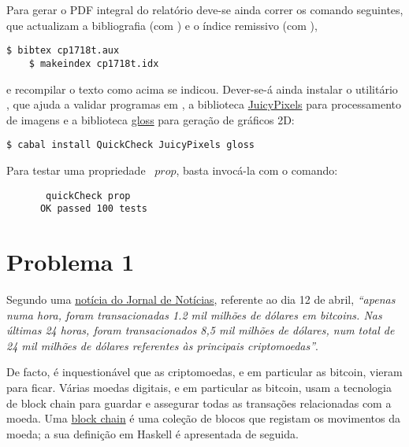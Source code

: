 \documentclass[a4paper]{article}
\newcommand{\Conid}[1]{\mathit{#1}}
\newcommand{\Varid}[1]{\mathit{#1}}
\def\resethooks{%
  \global\let\SaveRestoreHook\empty
  \global\let\ColumnHook\empty}
\let\hspre\empty
\let\hspost\empty
\begin{document}
Para gerar o PDF integral do relatório deve-se ainda correr os comando seguintes,
que actualizam a bibliografia (com \Bibtex) e o índice remissivo (com \Makeindex),
\begin{Verbatim}[fontsize=\small]
    $ bibtex cp1718t.aux
    $ makeindex cp1718t.idx
\end{Verbatim}
e recompilar o texto como acima se indicou. Dever-se-á ainda instalar o utilitário
\QuickCheck,
que ajuda a validar programas em \Haskell, a biblioteca
\href{https://hackage.haskell.org/package/JuicyPixels}{JuicyPixels} para processamento
de imagens e a biblioteca \href{http://gloss.ouroborus.net/}{gloss} para geração de gráficos 2D:
\begin{Verbatim}[fontsize=\small]
    $ cabal install QuickCheck JuicyPixels gloss
\end{Verbatim}
Para testar uma propriedade \QuickCheck~\ensuremath{\Varid{prop}}, basta invocá-la com o comando:
\begin{tabbing}\tt
~~~~~~quickCheck~prop\\
\tt ~~~~~~OK~passed~100~tests
\end{tabbing}

\section*{Problema 1}

Segundo uma \href{https://www.jn.pt/economia/interior/compra-diaria-de-bitcoins-iguala-acoes-da-apple-9257302.html}{notícia do Jornal de Notícias}, 
referente ao dia 12 de abril, \emph{``apenas numa hora, foram transacionadas 1.2 mil milhões de dólares em bitcoins. Nas últimas 24 horas, foram transacionados 8,5 mil milhões de dólares, num total de 24 mil milhões de dólares referentes às principais criptomoedas''}.

De facto, é inquestionável que as criptomoedas, e em particular as bitcoin, vieram para ficar.
%
Várias moedas digitais, e em particular as bitcoin, usam a tecnologia de block chain
para guardar e assegurar todas as transações relacionadas com a moeda.
%
Uma \href{https://en.bitcoin.it/wiki/Block_chain}{block chain} é uma coleção de blocos que registam os movimentos da moeda; a sua definição em Haskell é apresentada de seguida.

\resethooks
\end{document}
